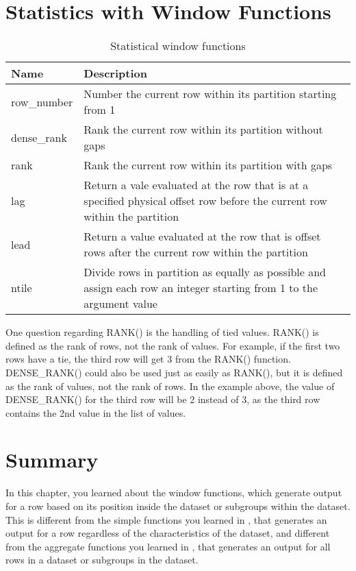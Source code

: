 \section{Statistics with Window Functions}
\begin{table}
    \centering
    \caption{Statistical window functions}
    \begin{tabularx}{\textwidth}{lX}
        \hline
        Name        & Description                                                                                                               \\
        \hline
        row\_number & Number the current row within its partition starting from 1                                                               \\
        dense\_rank & Rank the current row within its partition without gaps                                                                    \\
        rank        & Rank the current row within its partition with gaps                                                                       \\
        lag         & Return a vale evaluated at the row that is at a specified physical offset row before the current row within the partition \\
        lead        & Return a value evaluated at the row that is offset rows after the current row within the partition                        \\
        ntile       & Divide rows in partition as equally as possible and assign each row an integer starting from 1 to the argument value      \\
        \hline
    \end{tabularx}
\end{table}

\begin{tcolorbox}[title=Note]
    One question regarding RANK() is the handling of tied values. RANK() is defined as the rank of rows, not the rank of values. For example, if the first two rows have a tie, the third row will get 3 from the RANK() function. DENSE\_RANK() could also be used just as easily as RANK(), but it is defined as the rank of values, not the rank of rows. In the example above, the value of DENSE\_RANK() for the third row will be 2 instead of 3, as the third row contains the 2nd value in the list of values.
\end{tcolorbox}
\section{Summary}
In this chapter, you learned about the window functions, which generate output for a row based on its position inside the dataset or subgroups within the dataset. This is different from the simple functions you learned in , that generates an output for a row regardless of the characteristics of the dataset, and different from the aggregate functions you learned in , that generates an output for all rows in a dataset or subgroups in the dataset.

